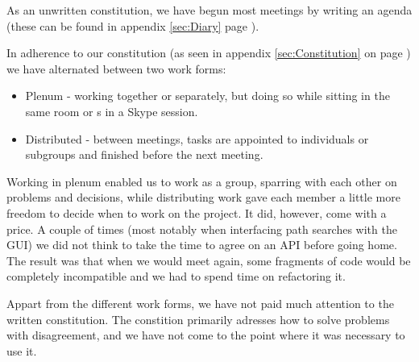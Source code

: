 As an unwritten constitution, we have begun most meetings by writing an agenda (these can be found in appendix \ref{sec:Diary} page \pageref{sec:Diary}).

In adherence to our constitution (as seen in appendix \ref{sec:Constitution} on page \pageref{sec:Constitution})
we have alternated between two work forms: 
\begin{itemize}
	\item Plenum - working together or separately, but doing so while sitting in the same room or s in a Skype session.
	\item Distributed - between meetings, tasks are appointed to individuals or subgroups and finished before the next meeting.
\end{itemize}
Working in plenum enabled us to work as a group, sparring with each other on problems and decisions, while distributing work gave each member a little more freedom to decide when to work on the project.
It did, however, come with a price. A couple of times (most notably when interfacing path searches with the GUI) we did not think to take the time to agree on an API before going home. The result was that when we would meet again, some fragments of code would be completely incompatible and we had to spend time on refactoring it.

Appart from the different work forms, we have not paid much attention to the written constitution. The constition primarily adresses how to solve problems with disagreement, and we have not come to the point where it was necessary to use it.
